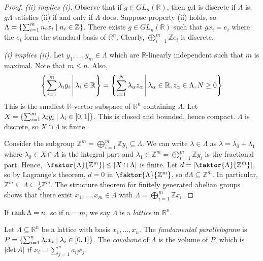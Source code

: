 \begin{proof}
    \emph{(ii) implies (i).}
    Observe that if \( g \in GL_n(\mathbb R) \), then \( g\Lambda \) is discrete if \( \Lambda \) is.
    \( g\Lambda \) satisfies (ii) if and only if \( \Lambda \) does.
    Suppose property (ii) holds, so \( \Lambda = \qty{\sum_{i=1}^m n_i x_i \mid n_i \in \mathbb Z} \).
    There exists \( g \in GL_n(\mathbb R) \) such that \( gx_i = e_i \) where the \( e_i \) form the standard basis of \( \mathbb R^n \).
    Clearly, \( \bigoplus_{i=1}^m \mathbb Z e_i \) is discrete.

    \emph{(i) implies (ii).}
    Let \( y_1, \dots, y_m \in \Lambda \) which are \( \mathbb R \)-linearly independent such that \( m \) is maximal.
    Note that \( m \leq n \).
    Also,
    \[ \qty{\sum_{i=1}^m \lambda_i y_i \,\middle|\,\lambda_i \in \mathbb R} = \qty{\sum_{i=1}^N \lambda_\alpha z_\alpha \,\middle|\,\lambda_\alpha \in \mathbb R, z_\alpha \in \Lambda, N \geq 0} \]
    This is the smallest \( \mathbb R \)-vector subspace of \( \mathbb R^n \) containing \( \Lambda \).
    Let \( X = \qty{\sum_{i=1}^m \lambda_i y_i \mid \lambda_i \in [0,1]} \).
    This is closed and bounded, hence compact.
    \( \Lambda \) is discrete, so \( X \cap \Lambda \) is finite.

    Consider the subgroup \( \mathbb Z^m = \bigoplus_{i=1}^m \mathbb Z y_i \subseteq \Lambda \).
    We can write \( \lambda \in \Lambda \) as \( \lambda = \lambda_0 + \lambda_1 \) where \( \lambda_0 \in X \cap \Lambda \) is the integral part and \( \lambda_1 \in \mathbb Z^m = \bigoplus_{i=1}^m \mathbb Z y_i \) is the fractional part.
    Hence, \( \abs{\faktor{\Lambda}{\mathbb Z^m}} \leq \abs{X \cap \Lambda} \) is finite.
    Let \( d = \abs{\faktor{\Lambda}{\mathbb Z^m}} \), so by Lagrange's theorem, \( d = 0 \) in \( \faktor{\Lambda}{\mathbb Z^m} \), so \( d\Lambda \subseteq \mathbb Z^m \).
    In particular, \( \mathbb Z^m \subseteq \Lambda \subseteq \frac{1}{d} \mathbb Z^m \).
    The structure theorem for finitely generated abelian groups shows that there exist \( x_1, \dots, x_m \in \Lambda \) with \( \Lambda = \bigoplus_{i=1}^m \mathbb Z x_i \).
\end{proof}
\begin{definition}
    If \( \rank \Lambda = n \), so if \( n = m \), we say \( \Lambda \) is a \emph{lattice} in \( \mathbb R^n \).
\end{definition}
\begin{definition}
    Let \( \Lambda \subseteq \mathbb R^n \) be a lattice with basis \( x_1, \dots, x_n \).
    The \emph{fundamental parallelogram} is \( P = \qty{\sum_{i=1}^n \lambda_i x_i \mid \lambda_i \in [0,1]} \).
    The \emph{covolume} of \( \Lambda \) is the volume of \( P \), which is \( \abs{\det A} \) if \( x_i = \sum_{j=1}^n a_{ij} e_j \).
\end{definition}
